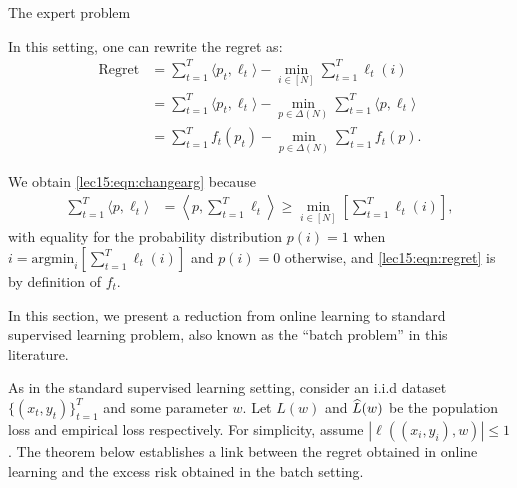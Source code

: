 \begin{algorithm}[h]
\caption{The expert problem}
\label{lec15:alg:expert_discrete_oco}
\end{algorithm}

In this setting, one can rewrite the regret as:
\begin{align}
\text{Regret} &= \sum_{t=1}^T \langle p_t, \ell_t \rangle - \min_{i\in[N]}\sum_{t=1}^T \ell_t(i)  \\
&= \sum_{t=1}^T \langle p_t, \ell_t \rangle - \min_{p \in \Delta(N)}\sum_{t=1}^T \langle p, \ell_t \rangle \label{lec15:eqn:changearg} \\
&= \sum_{t=1}^T f_t(p_t) - \min_{p \in \Delta(N)}\sum_{t=1}^T f_t(p). \label{lec15:eqn:regret}
\end{align}

We obtain \eqref{lec15:eqn:changearg} because
\begin{align}
\sum_{t=1}^T \langle p, \ell_t \rangle &=  \left\langle p,  \sum_{t=1}^T\ell_t \right\rangle \geq \min_{i \in [N]} \left[ \sum_{t=1}^T \ell_t (i) \right],
\end{align}
with equality for the probability distribution $p(i) =1$ when $i = \text{argmin}_i \left[ \sum_{t=1}^T \ell_t (i) \right]$ and $p(i) = 0$ otherwise, and \eqref{lec15:eqn:regret} is by definition of $f_t$.


In this section, we present a reduction from online learning to standard supervised learning problem, also known as the ``batch problem'' in this literature.

As in the standard supervised learning setting, consider an i.i.d dataset $\{(x_t, y_t)\}_{t=1}^T$ and some parameter $w$. Let $L(w)$ and $\widehat{L}(w)$ be the population loss and empirical loss respectively. For simplicity, assume $|\ell((x_i, y_i), w)| \leq 1$. The theorem below establishes a link between the regret obtained in online learning and the excess risk obtained in the batch setting.
    

